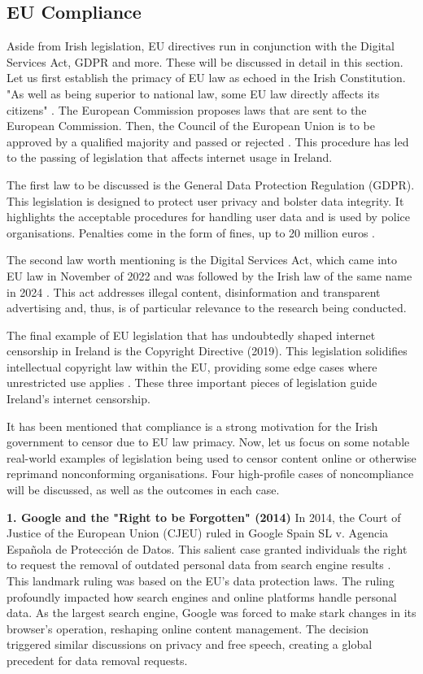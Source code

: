 \subsection{EU Compliance}
\label{sec:Chris-EU-Compliance}

Aside from Irish legislation, EU directives run in conjunction with the Digital Services Act, GDPR and more. These will be discussed in detail in this section. Let us first establish the primacy of EU law as echoed in the Irish Constitution. "As well as being superior to national law, some EU law directly affects its citizens" \cite{citizensinformation2025}. The European Commission proposes laws that are sent to the European Commission. Then, the Council of the European Union is to be approved by a qualified majority and passed or rejected \cite{europa2025}. This procedure has led to the passing of legislation that affects internet usage in Ireland. 

The first law to be discussed is the General Data Protection Regulation (GDPR). This legislation is designed to protect user privacy and bolster data integrity. It highlights the acceptable procedures for handling user data and is used by police organisations. Penalties come in the form of fines, up to 20 million euros \cite{gdprinfo2025}.

The second law worth mentioning is the Digital Services Act, which came into EU law in November of 2022 and was followed by the Irish law of the same name in 2024 \cite{enterprisegovie2025} \cite{irishstatutebook2024}. This act addresses illegal content, disinformation and transparent advertising and, thus, is of particular relevance to the research being conducted. 

The final example of EU legislation that has undoubtedly shaped internet censorship in Ireland is the Copyright Directive (2019). This legislation solidifies intellectual copyright law within the EU, providing some edge cases where unrestricted use applies \cite{EUCopyright}. These three important pieces of legislation guide Ireland's internet censorship. 

It has been mentioned that compliance is a strong motivation for the Irish government to censor due to EU law primacy. Now, let us focus on some notable real-world examples of legislation being used to censor content online or otherwise reprimand nonconforming organisations. Four high-profile cases of noncompliance will be discussed, as well as the outcomes in each case. 

\textbf{1. Google and the "Right to be Forgotten" (2014)}
In 2014, the Court of Justice of the European Union (CJEU) ruled in Google Spain SL v. Agencia Española de Protección de Datos. This salient case granted individuals the right to request the removal of outdated personal data from search engine results \cite{google2014}. This landmark ruling was based on the EU's data protection laws. The ruling profoundly impacted how search engines and online platforms handle personal data. As the largest search engine, Google was forced to make stark changes in its browser's operation, reshaping online content management. The decision triggered similar discussions on privacy and free speech, creating a global precedent for data removal requests.

